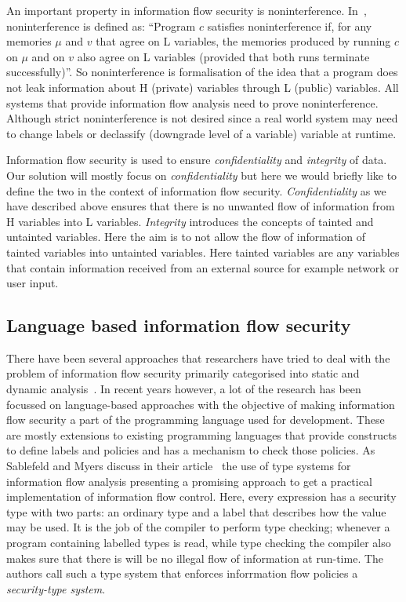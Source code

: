 An important property in information flow security is noninterference. In~\cite{PrincInfoSec},
noninterference is defined as: ``Program $c$ satisfies noninterference if, for
any memories $\mu$ and $v$ that agree on L variables, the memories produced by
running $c$ on $\mu$ and on $v$ also agree on L variables (provided that both runs
terminate successfully)''. So noninterference is formalisation of the idea that a
program does not leak information about H (private) variables through L (public)
variables. All systems that provide information flow analysis need to prove
noninterference. Although strict noninterference is not desired since a real world
system may need to change labels or declassify (downgrade level of a variable)
variable at runtime.

Information flow security is used to ensure \textit{confidentiality} and \textit{integrity}
of data. Our solution will mostly focus on \textit{confidentiality} but here we would
briefly like to define the two in the context of information flow security. \textit{Confidentiality}
as we have described above ensures that there is no unwanted flow of information
from H variables into L variables. \textit{Integrity} introduces the concepts of
tainted and untainted variables. Here the aim is to not allow the flow of information
of tainted variables into untainted variables. Here tainted variables are any
variables that contain information received from an external source for example
network or user input.

\subsection{Language based information flow security \label{subsec:langinfo}}
There have been several approaches that researchers have tried to deal with the
problem of information flow security primarily categorised into static and dynamic
analysis~\cite{Russo, Chlipala}. In recent years however, a lot of the research has
been focussed on language-based approaches with the objective of making information
flow security a part of the programming language used for development. These are
mostly extensions to existing programming languages that provide constructs to define
labels and policies and has a mechanism to check those policies. As Sablefeld and
Myers discuss in their article~\cite{LangInfo} the use of type systems for information
flow analysis presenting a promising approach to get a practical implementation of
information flow control. Here, every expression has a security type with two parts:
an ordinary type and a label that describes how the value may be used. It is the
job of the compiler to perform type checking; whenever a program containing labelled
types is read, while type checking the compiler also makes sure that there is will
be no illegal flow of information at run-time. The authors call such a type system
that enforces inforrmation flow policies a \textit{security-type system}.

